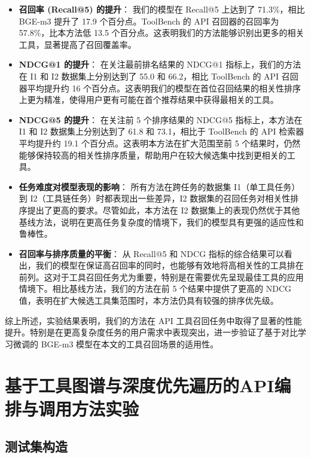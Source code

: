 \begin{itemize}
    \item \textbf{召回率 (Recall@5) 的提升}：
    我们的模型在 Recall@5 上达到了 71.3\%，相比 BGE-m3 提升了 17.9 个百分点。ToolBench 的 API 召回器的召回率为 57.8\%，比本方法低 13.5 个百分点。这表明我们的方法能够识别出更多的相关工具，显著提高了召回覆盖率。

    \item \textbf{NDCG@1 的提升}：
    在关注最前排名结果的 NDCG@1 指标上，我们的方法在 I1 和 I2 数据集上分别达到了 55.0 和 66.2，相比 ToolBench 的 API 召回器平均提升约 16 个百分点。这表明我们的模型在首位召回结果的相关性排序上更为精准，使得用户更有可能在首个推荐结果中获得最相关的工具。

    \item \textbf{NDCG@5 的提升}：
    在关注前 5 个排序结果的 NDCG@5 指标上，本方法在 I1 和 I2 数据集上分别达到了 61.8 和 73.1，相比于 ToolBench 的 API 检索器平均提升约 19.1 个百分点。这表明本方法在扩大范围至前 5 个结果时，仍然能够保持较高的相关性排序质量，帮助用户在较大候选集中找到更相关的工具。

    \item \textbf{任务难度对模型表现的影响}：
    所有方法在跨任务的数据集 I1（单工具任务）到 I2（工具链任务）时都表现出一些差异，I2 数据集的召回任务对相关性排序提出了更高的要求。尽管如此，本方法在 I2 数据集上的表现仍然优于其他基线方法，说明在更高任务复杂度的情境下，我们的模型具有更强的适应性和鲁棒性。

    \item \textbf{召回率与排序质量的平衡}：
    从 Recall@5 和 NDCG 指标的综合结果可以看出，我们的模型在保证高召回率的同时，也能够有效地将高相关性的工具排在前列。这对于工具召回任务尤为重要，特别是在需要优先呈现最佳工具的应用情境下。相比基线方法，我们的方法在前 5 个结果中提供了更高的 NDCG 值，表明在扩大候选工具集范围时，本方法仍具有较强的排序优先级。

\end{itemize}

综上所述，实验结果表明，我们的方法在 API 工具召回任务中取得了显著的性能提升。特别是在更高复杂度任务的用户需求中表现突出，进一步验证了基于对比学习微调的 BGE-m3 模型在本文的工具召回场景的适用性。

\section{基于工具图谱与深度优先遍历的API编排与调用方法实验}

\subsection{测试集构造}

